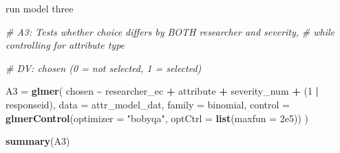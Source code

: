 \documentclass[
]{article}
\newenvironment{Shaded}{\begin{snugshade}}{\end{snugshade}}
\newcommand{\AttributeTok}[1]{\textcolor[rgb]{0.13,0.29,0.53}{#1}}
\newcommand{\CommentTok}[1]{\textcolor[rgb]{0.56,0.35,0.01}{\textit{#1}}}
\newcommand{\DecValTok}[1]{\textcolor[rgb]{0.00,0.00,0.81}{#1}}
\newcommand{\FloatTok}[1]{\textcolor[rgb]{0.00,0.00,0.81}{#1}}
\newcommand{\FunctionTok}[1]{\textcolor[rgb]{0.13,0.29,0.53}{\textbf{#1}}}
\newcommand{\NormalTok}[1]{#1}
\newcommand{\OtherTok}[1]{\textcolor[rgb]{0.56,0.35,0.01}{#1}}
\newcommand{\SpecialCharTok}[1]{\textcolor[rgb]{0.81,0.36,0.00}{\textbf{#1}}}
\newcommand{\StringTok}[1]{\textcolor[rgb]{0.31,0.60,0.02}{#1}}
\begin{document}
run model three

\begin{Shaded}
\begin{Highlighting}[]
\CommentTok{\# A3: Tests whether choice differs by BOTH researcher and severity,}
\CommentTok{\# while controlling for attribute type}

\CommentTok{\# DV: chosen (0 = not selected, 1 = selected)}

\NormalTok{A3 }\OtherTok{=} \FunctionTok{glmer}\NormalTok{(}
\NormalTok{  chosen }\SpecialCharTok{\textasciitilde{}}\NormalTok{ researcher\_ec }\SpecialCharTok{+}\NormalTok{ attribute }\SpecialCharTok{+}\NormalTok{ severity\_num }\SpecialCharTok{+}
\NormalTok{    (}\DecValTok{1} \SpecialCharTok{|}\NormalTok{ responseid),}
  \AttributeTok{data =}\NormalTok{ attr\_model\_dat,}
  \AttributeTok{family =}\NormalTok{ binomial,}
  \AttributeTok{control =} \FunctionTok{glmerControl}\NormalTok{(}\AttributeTok{optimizer =} \StringTok{"bobyqa"}\NormalTok{, }\AttributeTok{optCtrl =} \FunctionTok{list}\NormalTok{(}\AttributeTok{maxfun =} \FloatTok{2e5}\NormalTok{))}
\NormalTok{)}

\FunctionTok{summary}\NormalTok{(A3)}
\end{Highlighting}
\end{Shaded}
\end{document}
